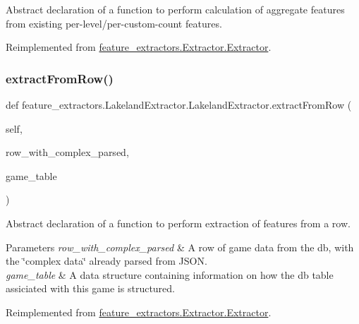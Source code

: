 Abstract declaration of a function to perform calculation of aggregate features from existing per-\/level/per-\/custom-\/count features. 



Reimplemented from \mbox{\hyperlink{classfeature__extractors_1_1_extractor_1_1_extractor_a7622c0b66dd98f59a8010c3511f4bdad}{feature\+\_\+extractors.\+Extractor.\+Extractor}}.

\mbox{\label{classfeature__extractors_1_1_lakeland_extractor_1_1_lakeland_extractor_a1648b69f5bf98cad7a5c67a2c5be90f9}} 
\subsubsection{\texorpdfstring{extractFromRow()}{extractFromRow()}}
{\footnotesize\ttfamily def feature\+\_\+extractors.\+Lakeland\+Extractor.\+Lakeland\+Extractor.\+extract\+From\+Row (\begin{DoxyParamCaption}\item[{}]{self,  }\item[{}]{row\+\_\+with\+\_\+complex\+\_\+parsed,  }\item[{\mbox{\hyperlink{class_game_table_1_1_game_table}{Game\+Table}}}]{game\+\_\+table }\end{DoxyParamCaption})}



Abstract declaration of a function to perform extraction of features from a row. 


\begin{DoxyParams}{Parameters}
{\em row\+\_\+with\+\_\+complex\+\_\+parsed} & A row of game data from the db, with the \char`\"{}complex data\char`\"{} already parsed from J\+S\+ON. \\
\hline
{\em game\+\_\+table} & A data structure containing information on how the db table assiciated with this game is structured. \\
\hline
\end{DoxyParams}


Reimplemented from \mbox{\hyperlink{classfeature__extractors_1_1_extractor_1_1_extractor_a98fc31f77b3c7650f49480097f1f6da4}{feature\+\_\+extractors.\+Extractor.\+Extractor}}.

